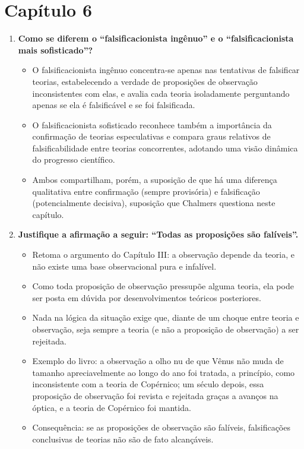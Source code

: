 \documentclass[10pt,a4paper]{extarticle}
\begin{document}
\section*{Capítulo 6}
\begin{enumerate}[resume, label=\textbf{\arabic*.}, itemsep=10pt]

\item \textbf{Como se diferem o \enquote{falsificacionista ingênuo} e o \enquote{falsificacionista mais sofisticado}?}
\begin{itemize}
  \item O falsificacionista ingênuo concentra-se apenas nas tentativas de falsificar teorias, estabelecendo a verdade de proposições de observação inconsistentes com elas, e avalia cada teoria isoladamente perguntando apenas se ela é falsificável e se foi falsificada.
  \item O falsificacionista sofisticado reconhece também a importância da confirmação de teorias especulativas e compara graus relativos de falsificabilidade entre teorias concorrentes, adotando uma visão dinâmica do progresso científico.
  \item Ambos compartilham, porém, a suposição de que há uma diferença qualitativa entre confirmação (sempre provisória) e falsificação (potencialmente decisiva), suposição que Chalmers questiona neste capítulo.
\end{itemize}

\item \textbf{Justifique a afirmação a seguir: \enquote{Todas as proposições são falíveis}.}
\begin{itemize}
  \item Retoma o argumento do Capítulo III: a observação depende da teoria, e não existe uma base observacional pura e infalível.
  \item Como toda proposição de observação pressupõe alguma teoria, ela pode ser posta em dúvida por desenvolvimentos teóricos posteriores.
  \item Nada na lógica da situação exige que, diante de um choque entre teoria e observação, seja sempre a teoria (e não a proposição de observação) a ser rejeitada.
  \item Exemplo do livro: a observação a olho nu de que Vênus não muda de tamanho apreciavelmente ao longo do ano foi tratada, a princípio, como inconsistente com a teoria de Copérnico; um século depois, essa proposição de observação foi revista e rejeitada graças a avanços na óptica, e a teoria de Copérnico foi mantida.
  \item Consequência: se as proposições de observação são falíveis, falsificações conclusivas de teorias não são de fato alcançáveis.
\end{itemize}


\end{enumerate}
\end{document}
